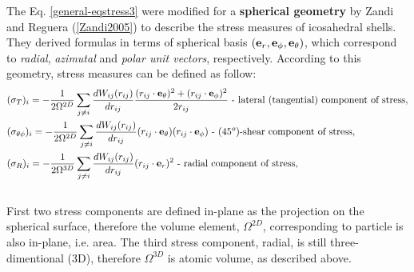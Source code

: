 \documentclass[letterpaper,10pt,english]{sphinxmanual}
\begin{document}
The Eq. \eqref{general-eqstress3} were modified for a \textbf{spherical geometry} by Zandi and Reguera ({\hyperref[general:zandi2005]{{[}Zandi2005{]}}}) to describe the stress measures of icosahedral shells. They derived formulas in terms of spherical basis $({\bf e}_r, {\bf e}_{\phi}, {\bf e}_\theta)$, which correspond to \emph{radial}, \emph{azimutal} and \emph{polar unit vectors}, respectively. According to this geometry, stress measures can be defined as follow:
\label{general:equation-eqstress9}\begin{gather}
\begin{split}\begin{split}
&(\sigma_{T})_{i} = - \frac{1}{2 \Omega^{2D}} \sum_{j \neq i}{ \frac{dW_{ij}(r_{ij})}{dr_{ij}}\frac{(r_{ij} \cdot {\bf e}_{\theta})^{2} + (r_{ij} \cdot {\bf e}_{\phi})^{2}}{2 r_{ij}} } \text{ - lateral (tangential) component of stress}, \\
&(\sigma_{\theta\phi})_{i} = - \frac{1}{2 \Omega^{2D}} \sum_{j \neq i}{ \frac{dW_{ij}(r_{ij})}{dr_{ij}}(r_{ij} \cdot {\bf e}_{\theta})(r_{ij} \cdot {\bf e}_{\phi})} \text{ - ($45^o$)-shear component of stress}, \\
&(\sigma_{R})_{i} = - \frac{1}{2 \Omega^{3D}} \sum_{j \neq i}{ \frac{dW_{ij}(r_{ij})}{dr_{ij}}(r_{ij} \cdot {\bf e}_{r})^{2}} \text{ - radial component of stress}, \\
\end{split}\end{split}\label{general-eqstress9}\\\begin{split}\end{split}\notag
\end{gather}
First two stress components are defined in-plane as the projection on the spherical surface, therefore the volume element, $\Omega^{2D}$, corresponding to particle is also in-plane, i.e. area. The third stress component, radial, is still three-dimentional (3D), therefore $\Omega^{3D}$ is atomic volume, as described above.
\end{document}
